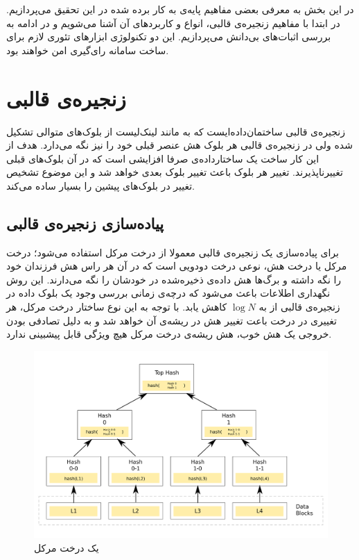 در این بخش به معرفی بعضی مفاهیم پایه‌ی به کار برده شده در این تحقیق می‌پردازیم. در ابتدا با مفاهیم زنجیره‌ی قالبی، انواع و کاربرد‌های آن آشنا می‌شویم و در ادامه به بررسی اثبات‌های بی‌دانش می‌پردازیم. این دو تکنولوژی ابزارهای تئوری لازم برای ساخت سامانه رای‌گیری امن خواهند بود.
\section{زنجیره‌ی قالبی}
زنجیره‌ی قالبی ساختمان‌داده‌ایست که به مانند لینک‌‌لیست
از بلوک‌‌های متوالی تشکیل شده ولی در زنجیره‌ی قالبی هر بلوک هش
عنصر قبلی خود را نیز نگه ‌می‌دارد. هدف از این کار ساخت یک ساختارداده‌ی صرفا افزایشی 
است که در آن‌ بلوک‌های قبلی تغییرناپذیرند. تغییر هر بلوک باعث تغییر بلوک بعدی خواهد شد و این موضوع تشخیص تغییر در بلوک‌های پیشین را بسیار ساده می‌کند.
\subsection{پیاده‌سازی زنجیره‌ی قالبی}


برای پیاده‌سازی یک زنجیره‌ی قالبی معمولا از درخت مرکل
 استفاده‌ می‌شود؛ درخت مرکل یا درخت هش، نوعی درخت دودویی 
 است که در آن هر راس هش فرزندان خود را نگه ‌داشته و برگ‌ها هش داده‌ی ذخیره‌شده در خودشان را نگه می‌دارند. این روش نگهداری اطلاعات باعث می‌شود که درچه‌ی زمانی بررسی وجود یک بلوک داده در زنجیره‌ی قالبی از 
 به 
$ \log N$
 کاهش یابد. با توجه به این نوع ساختار درخت مرکل، هر تغییری در درخت باعت تغییر هش در ریشه‌ی آن خواهد شد و به دلیل تصادفی بودن خروجی یک هش خوب، هش ریشه‌ی درخت مرکل هیچ ویژگی قابل پیشبینی ندارد.
 
 \begin{figure}[th!]
 	\centering
 	\includegraphics[width=.7\linewidth]{Hash_Tree.png}
 	\caption {یک درخت مرکل}
 	\label{fig:merkle}
 \end{figure}
 
